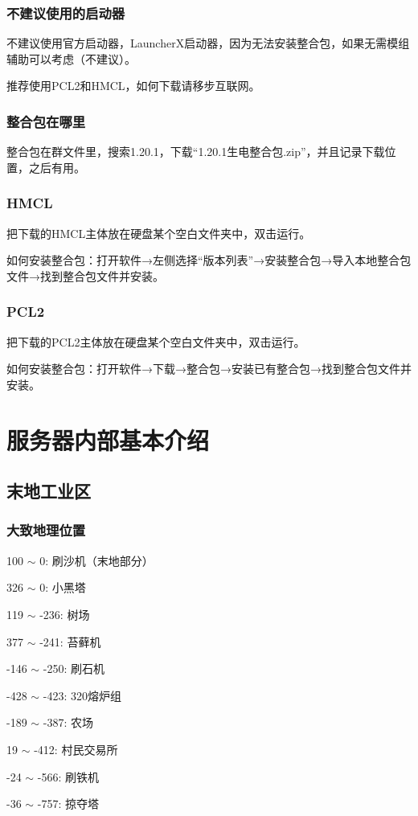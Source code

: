 \documentclass[UTF8,a4paper]{article}
\begin{document}
			\subsubsection{不建议使用的启动器}
				\par 不建议使用官方启动器，LauncherX启动器，因为无法安装整合包，如果无需模组辅助可以考虑（不建议）。
				\par 推荐使用PCL2和HMCL，如何下载请移步互联网。
			\subsubsection{整合包在哪里}
				\par 整合包在群文件里，搜索1.20.1，下载“1.20.1生电整合包.zip”，并且记录下载位置，之后有用。
			\subsubsection{HMCL}
				\par 把下载的HMCL主体放在硬盘某个空白文件夹中，双击运行。
				\par 如何安装整合包：打开软件→左侧选择“版本列表”→安装整合包→导入本地整合包文件→找到整合包文件并安装。
			\subsubsection{PCL2}
				\par 把下载的PCL2主体放在硬盘某个空白文件夹中，双击运行。
				\par 如何安装整合包：打开软件→下载→整合包→安装已有整合包→找到整合包文件并安装。
	\section{服务器内部基本介绍}
		\subsection{末地工业区}
			\subsubsection{大致地理位置}
				\par 100 $\sim$ 0: 刷沙机（末地部分）
				\par 326 $\sim$ 0: 小黑塔
				\par 119 $\sim$ -236: 树场
				\par 377 $\sim$ -241: 苔藓机
				\par -146 $\sim$ -250: 刷石机
				\par -428 $\sim$ -423: 320熔炉组
				\par -189 $\sim$ -387: 农场
				\par 19 $\sim$ -412: 村民交易所
				\par -24 $\sim$ -566: 刷铁机
				\par -36 $\sim$ -757: 掠夺塔
\end{document}
